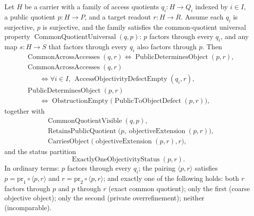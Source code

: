 \begin{theorem}\label{thm:F17}
Let \(H\) be a carrier with a family of access quotients
\(q_i:H\to Q_i\) indexed by \(i\in I\), a public quotient
\(p:H\to P\), and a target readout \(r:H\to R\).  Assume each
\(q_i\) is surjective, \(p\) is surjective, and the family satisfies
the common-quotient universal property
\(\operatorname{CommonQuotientUniversal}(q,p)\): \(p\) factors
through every \(q_i\), and any map \(s:H\to S\) that factors through every
\(q_i\) also factors through \(p\).  Then
\begin{align*}
  &\operatorname{CommonAcrossAccesses}(q,r)
    \iff \operatorname{PublicDeterminesObject}(p,r),\\
  &\operatorname{CommonAcrossAccesses}(q,r)\\
  &\qquad{}\iff
    \forall i\in I,\,
      \operatorname{AccessObjectivityDefectEmpty}(q_i,r),\\
  &\operatorname{PublicDeterminesObject}(p,r)\\
  &\qquad{}\iff
    \operatorname{ObstructionEmpty}
      \bigl(\operatorname{PublicToObjectDefect}(p,r)\bigr),
\end{align*}
together with
\begin{align*}
  &\operatorname{CommonQuotientVisible}(q,p),\\
  &\operatorname{RetainsPublicQuotient}
      \bigl(p,\operatorname{objectiveExtension}(p,r)\bigr),\\
  &\operatorname{CarriesObject}
      \bigl(\operatorname{objectiveExtension}(p,r),r\bigr),
\end{align*}
and the status partition
\[
  \operatorname{ExactlyOneObjectivityStatus}(p,r).
\]
In ordinary terms: \(p\) factors through every \(q_i\); the pairing
\(\langle p,r\rangle\) satisfies \(p=\mathrm{pr}_1\circ\langle p,r\rangle\) and
\(r=\mathrm{pr}_2\circ\langle p,r\rangle\); and exactly one of the following holds:
both \(r\) factors through \(p\) and \(p\) through \(r\) (exact common quotient);
only the first (coarse objective object); only the second (private
overrefinement); neither (incomparable).
\end{theorem}
